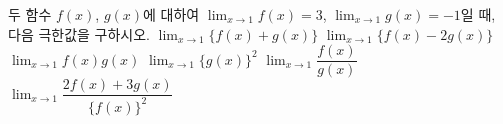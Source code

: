 두 함수 $f(x)$, $g(x)$에 대하여 $\displaystyle\lim_{x\to 1} f(x)=3$, $\displaystyle\lim_{x\to 1} g(x)=-1$일 때, 다음 극한값을 구하시오.
 $\displaystyle\lim_{x\to 1}\{f(x)+g(x)\}$
 $\displaystyle\lim_{x\to 1}\{f(x)-2g(x)\}$
 $\displaystyle\lim_{x\to 1} f(x)g(x)$
 $\displaystyle\lim_{x\to 1}\{g(x)\}^2$
 $\displaystyle\lim_{x\to 1}\dfrac{f(x)}{g(x)}$
 $\displaystyle\lim_{x\to 1}\dfrac{2f(x)+3g(x)}{\{f(x)\}^2}$
